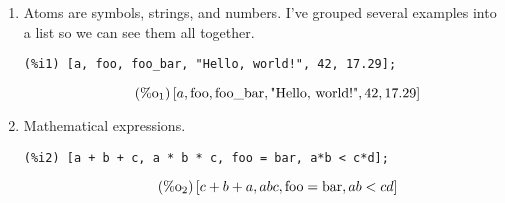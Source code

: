 \documentclass[12pt,leqno]{article}
\begin{document}
\begin{enumerate}

\item Atoms are symbols, strings, and numbers.
I've grouped several examples into a list so we can see them all together.
\begin{verbatim}
(%i1) [a, foo, foo_bar, "Hello, world!", 42, 17.29];
\end{verbatim}
\begin{equation}
\tag{$\mathop{\mathrm{\%o}_{1}}$}\left[a, \mathop{\mathrm{foo}}, \mathop{\mathrm{foo\_bar}}, \mbox{"Hello, world!"}, 42, 17.29\right]
\label{eq:doc-group1-code6-1}
\end{equation}

\item Mathematical expressions.
\begin{verbatim}
(%i2) [a + b + c, a * b * c, foo = bar, a*b < c*d];
\end{verbatim}
\begin{equation}
\tag{$\mathop{\mathrm{\%o}_{2}}$}\left[c+b+a, a b c, \mathop{\mathrm{foo}} = \mathop{\mathrm{bar}}, a b < c d\right]
\label{eq:doc-group1-code7-1}
\end{equation}



\end{enumerate}
\end{document}
